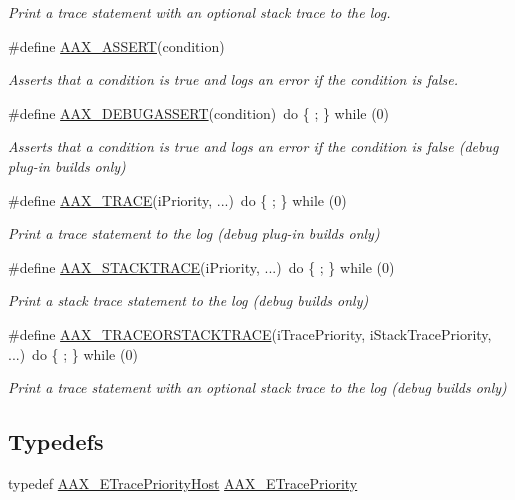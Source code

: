 \begin{DoxyCompactItemize}
\begin{DoxyCompactList}\small\item\em Print a trace statement with an optional stack trace to the log. \end{DoxyCompactList}\item 
\#define \hyperlink{a00158_a168ee44fd7a5485ab50160db36fb2988}{A\+A\+X\+\_\+\+A\+S\+S\+E\+R\+T}(condition)
\begin{DoxyCompactList}\small\item\em Asserts that a condition is true and logs an error if the condition is false. \end{DoxyCompactList}\item 
\#define \hyperlink{a00158_aa0253bd2994036fcfd6629ecf465d543}{A\+A\+X\+\_\+\+D\+E\+B\+U\+G\+A\+S\+S\+E\+R\+T}(condition)~do \{ ; \} while (0)
\begin{DoxyCompactList}\small\item\em Asserts that a condition is true and logs an error if the condition is false (debug plug-\/in builds only) \end{DoxyCompactList}\item 
\#define \hyperlink{a00158_ab53f1d6a94f8b6ebb3a101f71bfe4e82}{A\+A\+X\+\_\+\+T\+R\+A\+C\+E}(i\+Priority, ...)~do \{ ; \} while (0)
\begin{DoxyCompactList}\small\item\em Print a trace statement to the log (debug plug-\/in builds only) \end{DoxyCompactList}\item 
\#define \hyperlink{a00158_ae871829dd7297e4a5ae6c7094f6b5398}{A\+A\+X\+\_\+\+S\+T\+A\+C\+K\+T\+R\+A\+C\+E}(i\+Priority, ...)~do \{ ; \} while (0)
\begin{DoxyCompactList}\small\item\em Print a stack trace statement to the log (debug builds only) \end{DoxyCompactList}\item 
\#define \hyperlink{a00158_a96862f9cb28b6a49eb5dbd6da9975ed1}{A\+A\+X\+\_\+\+T\+R\+A\+C\+E\+O\+R\+S\+T\+A\+C\+K\+T\+R\+A\+C\+E}(i\+Trace\+Priority,  i\+Stack\+Trace\+Priority, ...)~do \{ ; \} while (0)
\begin{DoxyCompactList}\small\item\em Print a trace statement with an optional stack trace to the log (debug builds only) \end{DoxyCompactList}\end{DoxyCompactItemize}
\subsection*{Typedefs}
\begin{DoxyCompactItemize}
\item 
typedef \hyperlink{a00206_a2dd667e4dea5781f38832fd9f1725f1b}{A\+A\+X\+\_\+\+E\+Trace\+Priority\+Host} \hyperlink{a00158_a28ae6ea1f243f005a891c5c77a5a5211}{A\+A\+X\+\_\+\+E\+Trace\+Priority}
\end{DoxyCompactItemize}


